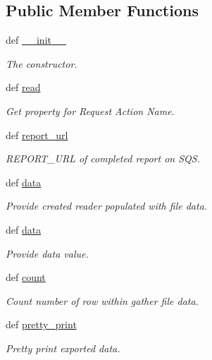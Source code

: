 \subsection*{Public Member Functions}
\begin{DoxyCompactItemize}
\item 
def \hyperlink{classtune_1_1management_1_1reports_1_1report__reader__base_1_1ReportReaderBase_a209c6b9ba1151084c53ef3767a75bcf3}{\-\_\-\-\_\-init\-\_\-\-\_\-}
\begin{DoxyCompactList}\small\item\em The constructor. \end{DoxyCompactList}\item 
def \hyperlink{classtune_1_1management_1_1reports_1_1report__reader__base_1_1ReportReaderBase_aa69b060ba23ee7403800be602c083a49}{read}
\begin{DoxyCompactList}\small\item\em Get property for Request Action Name. \end{DoxyCompactList}\item 
def \hyperlink{classtune_1_1management_1_1reports_1_1report__reader__base_1_1ReportReaderBase_ae6122bbe9996bc93ec9f9535ae568c77}{report\-\_\-url}
\begin{DoxyCompactList}\small\item\em R\-E\-P\-O\-R\-T\-\_\-\-U\-R\-L of completed report on S\-Q\-S. \end{DoxyCompactList}\item 
def \hyperlink{classtune_1_1management_1_1reports_1_1report__reader__base_1_1ReportReaderBase_a5c606aca915fa4590882722175756683}{data}
\begin{DoxyCompactList}\small\item\em Provide created reader populated with file data. \end{DoxyCompactList}\item 
def \hyperlink{classtune_1_1management_1_1reports_1_1report__reader__base_1_1ReportReaderBase_a5c606aca915fa4590882722175756683}{data}
\begin{DoxyCompactList}\small\item\em Provide data value. \end{DoxyCompactList}\item 
def \hyperlink{classtune_1_1management_1_1reports_1_1report__reader__base_1_1ReportReaderBase_a75cd9fbd6e625b7d7b4bf5bfce50ff3b}{count}
\begin{DoxyCompactList}\small\item\em Count number of row within gather file data. \end{DoxyCompactList}\item 
def \hyperlink{classtune_1_1management_1_1reports_1_1report__reader__base_1_1ReportReaderBase_ab6b5349638da5f23fc37a1b7d856f88b}{pretty\-\_\-print}
\begin{DoxyCompactList}\small\item\em Pretty print exported data. \end{DoxyCompactList}\end{DoxyCompactItemize}
